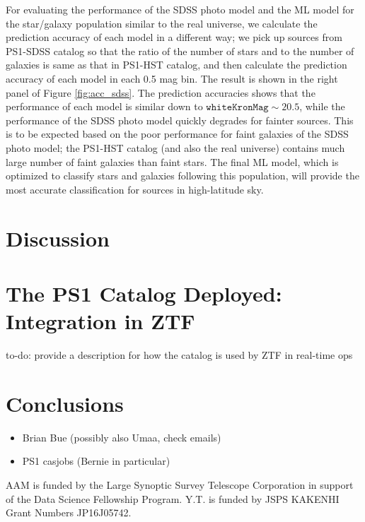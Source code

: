 \documentclass[twocolumn]{aastex62}
\newcommand{\todo}[1]{{\color{magenta} to-do: {#1}}}
\begin{document}
{For evaluating the performance of the SDSS photo model and the ML model 
for the star/galaxy population similar to the real universe, 
we calculate the prediction accuracy of each model in a different way; 
we pick up sources from PS1-SDSS catalog 
so that the ratio of the number of stars and to the number of galaxies 
is same as that in PS1-HST catalog, and then calculate the prediction accuracy of each model in each 0.5 mag bin. 
The result is shown in the right panel of Figure \ref{fig:acc_sdss}. 
The prediction accuracies shows that the performance of each model is similar 
down to $\mathtt{whiteKronMag} \sim20.5$, 
while the performance of the SDSS photo model quickly degrades for fainter sources. 
This is to be expected based on the poor performance for faint galaxies of the SDSS photo model; 
the PS1-HST catalog (and also the real universe) contains much large number of faint galaxies than faint stars. 
The final ML model, which is optimized to classify stars and galaxies following this population, 
will provide the most accurate classification for sources in high-latitude sky. 
} 






\section{Discussion}

\section{The PS1 Catalog Deployed: Integration in ZTF}

\todo{provide a description for how the catalog is used by ZTF in real-time ops}

\section{Conclusions}

\acknowledgements

\begin{itemize}
    \item Brian Bue (possibly also Umaa, check emails)
    \item PS1 casjobs (Bernie in particular)
\end{itemize}

AAM is funded by the Large Synoptic Survey Telescope Corporation in support of
the Data Science Fellowship Program. 
Y.T. is funded by JSPS KAKENHI Grant Numbers JP16J05742. 




\appendix




\end{document}

